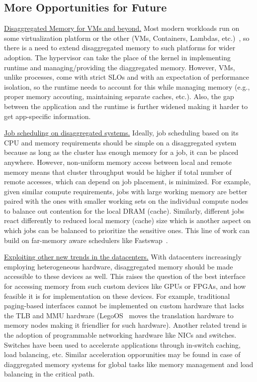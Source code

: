 \subsection{More Opportunities for Future}
\vspace{3pt}
\noindent \uline{Disaggregated Memory for VMs and beyond.}
Most modern workloads run on some virtualization platform 
or the other (VMs, Containers, Lambdas, etc.)~\cite{Aguilera2017}, 
so there is a need to extend disaggregated memory to such 
platforms for wider adoption. The hypervisor can take the place 
of the kernel in implementing runtime and managing/providing 
the diaggregated memory. However, VMs, unlike processes, come 
with strict SLOs and with an expectation of performance isolation,
so the runtime needs to account for this while managing memory 
(e.g., proper memory accouting, maintaining separate caches, etc.). 
Also, the gap between the application and the runtime is further 
widened making it harder to get app-specific information.

\vspace{3pt}
\noindent \uline{Job scheduling on disaggregated systems.}
Ideally, job scheduling based on its CPU and memory requirements 
should be simple on a disaggregated system because as long 
as the cluster has enough memory for a job, it can be placed  
anywhere. However, non-uniform memory access between local 
and remote memory means that cluster throughput would be 
higher if total number of remote accesses, which can depend
on job placement, is minimized. For example, given similar 
compute requirements, jobs with large working memory are   
better paired with the ones with smaller working sets on the 
individual compute nodes to balance out contention for the 
local DRAM (cache). Similarly, different jobs react differently 
to reduced local memory (cache) size which is another aspect on 
which jobs can be balanced to prioritize the sensitive ones.
This line of work can build on far-memory aware schedulers 
like Fastswap~\cite{fastswap}.

\vspace{3pt}
\noindent \uline{Exploiting other new trends 
in the datacenters.}
With datacenters increasingly employing heterogeneous 
hardware, disaggregated memory should be made accessible 
to these devices as well. This raises the question of 
the best interface for accessing memory from such  
custom devices like GPUs or FPGAs, and how feasible it is  
for implementation on these devices. For example, 
traditional paging-based interfaces cannot be 
implemented on custom hardware that lacks the TLB and MMU 
hardware (LegoOS~\cite{legoos} moves the translation hardware 
to memory nodes making it friendlier for such hardware). 
Another related trend is the 
adoption of programmable networking hardware like 
NICs and switches. Switches have been used to 
accelerate applications through in-switch caching, load
balancing, etc. Similar acceleration opporunities may be found 
in case of diaggregated memory systems for global tasks like 
memory management and load balancing in the critical path.

